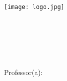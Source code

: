 
\begin{titlepage}
        \begin{center}
            \texttt{[image: logo.jpg]}\\[0.3cm]
            {\large \university}\\[0.2cm]
            {\large \faculty}\\[0.2cm]
            {\large \discipline}\\[4.1cm]
            {\bf \huge \mainTitle}\\[4.1cm]
        \end{center}
        \raggedleft{\normalsize \myid}\\[0.7cm]
        {\normalsize Professor(a): \teacher}
        \vfill
        \begin{center}
            {\large \city}\\[0.2cm]
            {\large \the\year}
        \end{center}
\end{titlepage}
